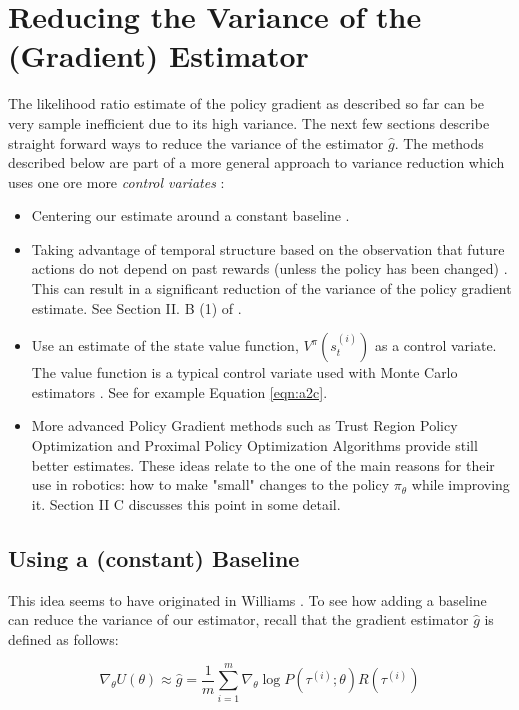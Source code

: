 \documentclass[11pt, oneside]{article}   	%
\begin{document}
\section{Reducing the Variance of the (Gradient) Estimator}
\label{sec:variance}
The likelihood ratio estimate of the policy gradient as described so far can be very sample inefficient due to its high variance. The next few sections describe straight forward ways to 
reduce the variance of the estimator $\hat{g}$. The methods described below are part of a more general approach to variance reduction which uses one ore more \emph{control variates} 
\cite{szechtman2003}:
\begin{itemize}
\item Centering our estimate around a constant baseline \cite{Williams1992}.
\item Taking advantage of temporal structure based on the observation that future actions do not depend on past rewards (unless the policy has been changed) . This can result in a significant 
reduction of the variance of the policy gradient estimate. See Section II. B (1) of \cite{Peters:2006fk}.
\item Use an estimate of the state value function, $V^{\pi}(s^{(i)}_t)$ as a control variate. The value function is a typical control variate used
with Monte Carlo estimators \cite{Greensmith:2004:VRT:1005332.1044710}.  See for example Equation \ref{eqn:a2c}.
\item More advanced Policy Gradient methods such as Trust Region Policy Optimization \cite{DBLP:journals/corr/SchulmanLMJA15} and Proximal Policy Optimization Algorithms \cite{2017arXiv170706347S} 
provide still better estimates. These ideas relate to the one of the main reasons for their use in robotics: how to make "small" changes to the policy $\pi_\theta$ while improving it.  
Section II C \cite{Peters:2006fk} discusses this point in some detail. 
\end{itemize}

\subsection{Using a (constant) Baseline}

This idea seems to have originated in Williams \cite{Williams1992}. To see how adding a baseline can reduce the variance of our estimator, recall that the gradient estimator $\hat{g}$ is defined as follows:

\begin{equation}
\nabla_\theta U(\theta) \approx \hat{g} = \frac{1}{m} \sum\limits_{i = 1}^{m} \nabla_{\theta} \log  P(\tau^{(i)} ; \theta) R(\tau^{(i)})
\end{equation}
\end{document}
